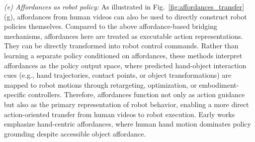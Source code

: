 \documentclass[Afour,sageh,times]{sagej}
\begin{document}
\textit{(e) Affordances as robot policy:} As illustrated in Fig.~\ref{fig:affordances_transfer}(g), affordances from human videos can also be used to directly construct robot policies themselves. Compared to the above affordance-based bridging mechanisms, affordances here are treated as executable action representations. They can be directly transformed into robot control commands. Rather than learning a separate policy conditioned on affordances, these methods interpret affordances as the policy output space, where predicted hand-object interaction cues (e.g., hand trajectories, contact points, or object transformations) are mapped to robot motions through retargeting, optimization, or embodiment-specific controllers. Therefore, affordances function not only as action guidance but also as the primary representation of robot behavior, enabling a more direct action-oriented transfer from human videos to robot execution. Early works emphasize hand-centric affordances, where human hand motion dominates policy grounding despite accessible object affordance.
\end{document}
